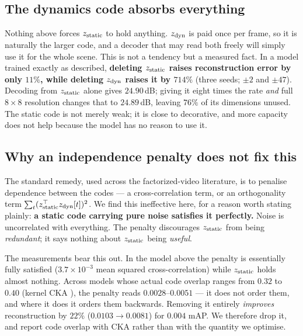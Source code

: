 \subsection{The dynamics code absorbs everything}
\label{sec:absorb}
Nothing above forces $z_{\mathrm{static}}$ to hold anything. $z_{\mathrm{dyn}}$ is paid once per frame, so it is
naturally the larger code, and a decoder that may read both freely will simply use it
for the whole scene. This is not a tendency but a measured fact. In a model trained
exactly as described, \textbf{deleting $z_{\mathrm{static}}$ raises reconstruction error by only
$11\%$, while deleting $z_{\mathrm{dyn}}$ raises it by $714\%$} (three seeds; $\pm2$ and $\pm47$).
Decoding from $z_{\mathrm{static}}$ alone gives $24.90$\,dB; giving it eight times the rate \emph{and}
full $8\times8$ resolution changes that to $24.89$\,dB, leaving $76\%$ of its
dimensions unused. The static code is not merely weak; it is
close to decorative, and more capacity does not help because the model has no reason to
use it.

\subsection{Why an independence penalty does not fix this}
\label{sec:indep}
The standard remedy, used across the factorized-video literature, is to penalise
dependence between the codes --- a cross-correlation term, or an orthogonality term
$\sum_t (z_{\mathrm{static}}^\top z_{\mathrm{dyn}}[t])^2$. We find this ineffective here, for a reason worth stating
plainly: \textbf{a static code carrying pure noise satisfies it perfectly.} Noise is
uncorrelated with everything. The penalty discourages $z_{\mathrm{static}}$ from being \emph{redundant};
it says nothing about $z_{\mathrm{static}}$ being \emph{useful}.

The measurements bear this out. In the model above the penalty is essentially fully
satisfied ($3.7\times10^{-3}$ mean squared cross-correlation) while $z_{\mathrm{static}}$ holds almost
nothing. Across models whose actual code overlap ranges from $0.32$ to $0.40$ (kernel
CKA \citep{cka}), the penalty reads $0.0028$--$0.0051$ --- it does not order them, and
where it does it orders them backwards. Removing it entirely \emph{improves}
reconstruction by $22\%$ ($0.0103\!\to\!0.0081$) for $0.004$ mAP. We therefore drop it, and report code
overlap with CKA rather than with the quantity we optimise.

